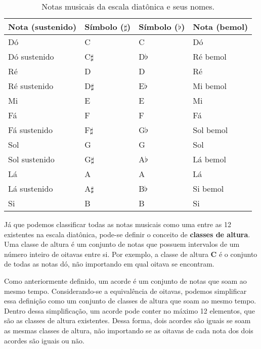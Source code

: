     \begin{table}
    \centering
    \begin{tabular}{|l|l|l|l|}
        \hline
        \textbf{Nota (sustenido)} & \textbf{Símbolo ($\sharp$)}   &  \textbf{Símbolo ($\flat$)} & \textbf{Nota (bemol)} \\
        \hline
        Dó             &  C          &  C         &  Dó            \\
        Dó sustenido   &  C$\sharp$  &  D$\flat$  &  Ré bemol      \\
        Ré             &  D          &  D         &  Ré            \\
        Ré sustenido   &  D$\sharp$  &  E$\flat$  &  Mi bemol      \\
        Mi             &  E          &  E         &  Mi            \\
        Fá             &  F          &  F         &  Fá            \\
        Fá sustenido   &  F$\sharp$  &  G$\flat$  &  Sol bemol     \\
        Sol            &  G          &  G         &  Sol           \\
        Sol sustenido  &  G$\sharp$  &  A$\flat$  &  Lá bemol      \\
        Lá             &  A          &  A         &  Lá            \\
        Lá sustenido   &  A$\sharp$  &  B$\flat$  &  Si bemol      \\
        Si             &  B          &  B         &  Si            \\
        \hline
    \end{tabular}
    \caption{Notas musicais da escala diatônica e seus nomes.}
    \label{tabela:notas}
    \end{table}
    

    Já que podemos classificar todas as notas musicais como uma entre as 12 existentes na escala diatônica, pode-se definir o conceito de \textbf{classes de altura}. Uma classe de altura é um conjunto de notas que possuem intervalos de um número inteiro de oitavas entre si. Por exemplo, a classe de altura \textbf{C} é o conjunto de todas as notas dó, não importando em qual oitava se encontram.
     
    Como anteriormente definido, um acorde é um conjunto de notas que soam ao mesmo tempo. Considerando-se a equivalência de oitavas, podemos simplificar essa definição como um conjunto de classes de altura que soam ao mesmo tempo. Dentro dessa simplificação, um acorde pode conter no máximo 12 elementos, que são as classes de altura existentes. Dessa forma, dois acordes são iguais se soam as mesmas classes de altura, não importando se as oitavas de cada nota dos dois acordes são iguais ou não.
    
